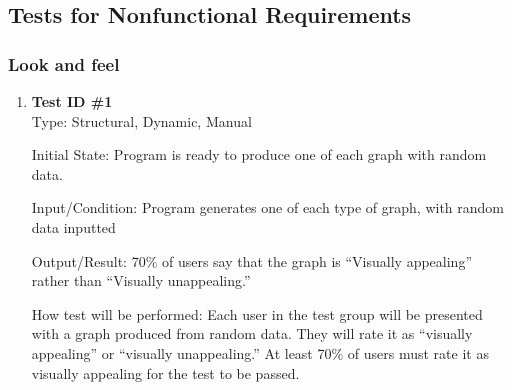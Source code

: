\documentclass[12pt, titlepage]{article}
\begin{document}
	
\subsection{Tests for Nonfunctional Requirements}
		
\subsubsection{Look and feel}
\begin{enumerate}
\item{\textbf{Test ID \#1\\}}
Type: Structural, Dynamic, Manual
					
Initial State:  Program is ready to produce one of each graph with random data.
					
Input/Condition: Program generates one of each type of graph, with random data inputted
					
Output/Result:  70\% of users say that the graph is ``Visually appealing'' rather than ``Visually unappealing.''
					
How test will be performed: Each user in the test group will be presented with a graph produced from random data. They will rate it as ``visually appealing'' or ``visually unappealing.'' At least 70\% of users must rate it as visually appealing for the test to be passed.
					
\end{enumerate}
\end{document}
